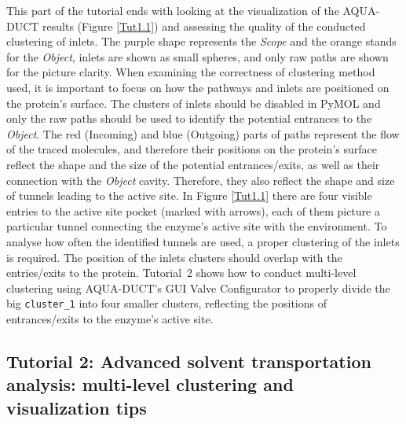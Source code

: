 \documentclass[9pt,tutorial]{livecoms}
\begin{document}
This part of the tutorial ends with looking at the visualization of the AQUA-DUCT results (Figure \ref{Tut1.1}) and assessing the quality of the conducted clustering of inlets. The purple shape represents the \emph{Scope} and the orange stands for the \emph{Object}, inlets are shown as small spheres, and only raw paths are shown for the picture clarity. When examining the correctness of clustering method used, it is important to focus on how the pathways and inlets are positioned on the protein's surface. The clusters of inlets should be disabled in PyMOL and only the raw paths should be used to identify the potential entrances to the \textit{Object}. The red (Incoming) and blue (Outgoing) parts of paths represent the flow of the traced molecules, and therefore their positions on the protein's surface reflect the shape and the size of the potential entrances/exits, as well as their connection with the \textit{Object} cavity. Therefore, they also reflect the shape and size of tunnels leading to the active site. In Figure \ref{Tut1.1} there are four visible entries to the active site pocket (marked with arrows), each of them picture a particular tunnel connecting the enzyme's active site with the environment. To analyse how often the identified tunnels are used, a proper clustering of the inlets is required. The position of the inlets clusters should overlap with the entries/exits to the protein. Tutorial~2 shows how to conduct multi-level clustering using AQUA-DUCT's GUI Valve Configurator to properly divide the big \texttt{cluster\_1} into four smaller clusters, reflecting the positions of entrances/exits to the enzyme's active site.

\subsection{Tutorial 2: Advanced solvent transportation analysis: multi-level clustering and visualization tips}
\end{document}
